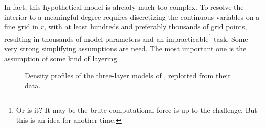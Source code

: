 In fact, this hypothetical model is already much too complex. To resolve the
interior to a meaningful degree requires discretizing the continuous variables
on a fine grid in $r$, with at least hundreds and preferably thousands of grid
points, resulting in thousands of model parameters and an
impracticable\footnote{Or is it? It may be the brute computational force is up
to the challenge. But this is an idea for another time.} task. Some very strong
simplifying assumptions are need. The most important one is the assumption of
some kind of layering.


\begin{figure}[tb!]
\centering
{}
\caption{Density profiles of the three-layer models of \citet{Nettelmann2013b},
replotted from their data.}
\label{fig:N13_profs}
\end{figure}
